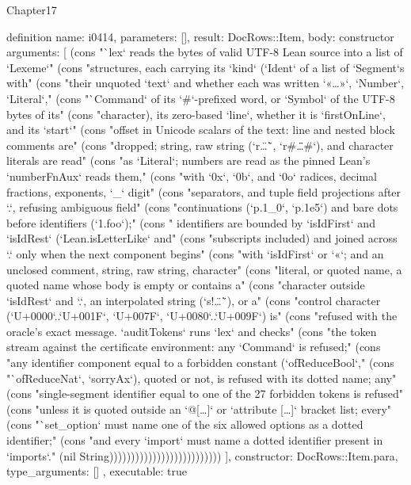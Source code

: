 \begin{lexlean}{Chapter17}
\begin{semanticmodule}
definition{
  name: i0414,
  parameters: [],
  result: DocRows::Item,
  body: constructor{
    arguments: [
      (cons "`lex` reads the bytes of valid UTF-8 Lean source into a list of `Lexeme`" (cons "structures, each carrying its `kind` (`Ident` of a list of `Segment`s with" (cons "their unquoted `text` and whether each was written `«…»`, `Number`, `Literal`," (cons "`Command` of its `#`-prefixed word, or `Symbol` of the UTF-8 bytes of its" (cons "character), its zero-based `line`, whether it is `firstOnLine`, and its `start`" (cons "offset in Unicode scalars of the text: line and nested block comments are" (cons "dropped; string, raw string (`r\"…\"`, `r#\"…\"#`), and character literals are read" (cons "as `Literal`; numbers are read as the pinned Lean's `numberFnAux` reads them," (cons "with `0x`, `0b`, and `0o` radices, decimal fractions, exponents, `_` digit" (cons "separators, and tuple field projections after `.`, refusing ambiguous field" (cons "continuations (`p.1_0`, `p.1e5`) and bare dots before identifiers (`1.foo`);" (cons " identifiers are bounded by `isIdFirst` and `isIdRest` (`Lean.isLetterLike` and" (cons "subscripts included) and joined across `.` only when the next component begins" (cons "with `isIdFirst` or `«`; and an unclosed comment, string, raw string, character" (cons "literal, or quoted name, a quoted name whose body is empty or contains a" (cons "character outside `isIdRest` and `.`, an interpolated string (`s!\"…\"`), or a" (cons "control character (`U+0000`..`U+001F`, `U+007F`, `U+0080`..`U+009F`) is" (cons "refused with the oracle's exact message. `auditTokens` runs `lex` and checks" (cons "the token stream against the certificate environment: any `Command` is refused;" (cons "any identifier component equal to a forbidden constant (`ofReduceBool`," (cons "`ofReduceNat`, `sorryAx`), quoted or not, is refused with its dotted name; any" (cons "single-segment identifier equal to one of the 27 forbidden tokens is refused" (cons "unless it is quoted outside an `@[…]` or `attribute […]` bracket list; every" (cons "`set_option` must name one of the six allowed options as a dotted identifier;" (cons "and every `import` must name a dotted identifier present in `imports`." (nil String))))))))))))))))))))))))))
    ],
    constructor: DocRows::Item.para,
    type_arguments: []
  },
  executable: true
}


\end{semanticmodule}
\end{lexlean}
